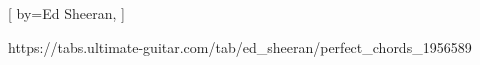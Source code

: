 [
by={Ed Sheeran},%
]


https://tabs.ultimate-guitar.com/tab/ed_sheeran/perfect_chords_1956589

  





\endsong
